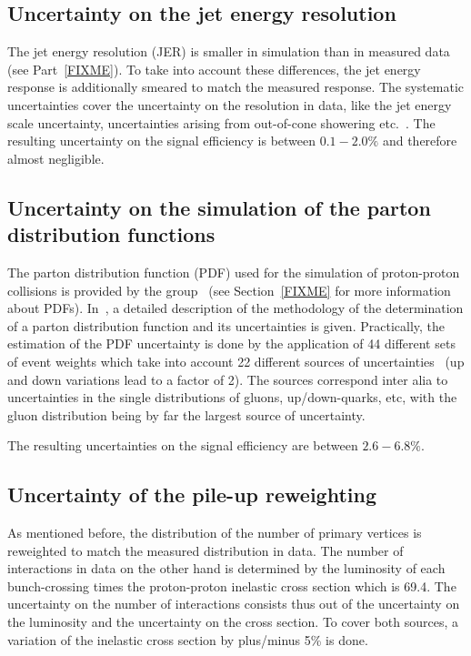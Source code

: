 \subsection*{Uncertainty on the jet energy resolution}
The jet energy resolution (JER) is smaller in simulation than in measured data (see Part~\ref{FIXME}). 
To take into account these differences, the jet energy response is additionally smeared to match the measured response.
The systematic uncertainties cover the uncertainty on the resolution in data, like the jet energy scale uncertainty, uncertainties arising from out-of-cone showering etc.~\cite{bib:CMS:JME_PAS,bib:Kristin_Thesis}.
The resulting uncertainty on the signal efficiency is between $0.1-2.0\%$ and therefore almost negligible.

\subsection*{Uncertainty on the simulation of the parton distribution functions}
The parton distribution function (PDF) used for the simulation of proton-proton collisions is provided by the \cteq group~\cite{Pumplin:2002vw} (see Section~\ref{FIXME} for more information about PDFs).
In~\cite{Pumplin:2002vw}, a detailed description of the methodology of the determination of a parton distribution function and its uncertainties is given.
Practically, the estimation of the PDF uncertainty is done by the application of 44 different sets of event weights which take into account 22 different sources of uncertainties~\cite{Botje:2011sn,bib:PDF_practical} 
(up and down variations lead to a factor of 2).
The sources correspond inter alia to uncertainties in the single distributions of gluons, up/down-quarks, etc, with the gluon distribution being by far the largest source of uncertainty.

The resulting uncertainties on the signal efficiency are between $2.6-6.8\%$.

\subsection*{Uncertainty of the pile-up reweighting}
As mentioned before, the distribution of the number of primary vertices is reweighted to match the measured distribution in data.
The number of interactions in data on the other hand is determined by the luminosity of each bunch-crossing times the proton-proton inelastic cross section which is 69.4\mb.
The uncertainty on the number of interactions consists thus out of the uncertainty on the luminosity and the uncertainty on the cross section.
To cover both sources, a variation of the inelastic cross section by plus/minus 5\% is done.


